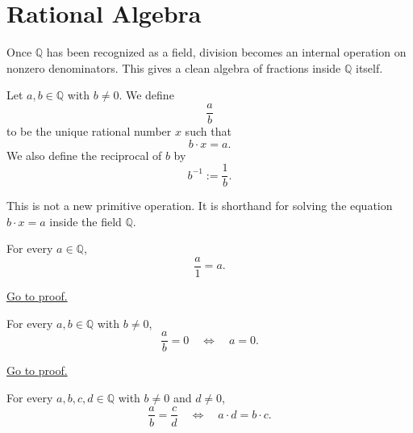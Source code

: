 
\section{Rational Algebra}
\label{sec:rational-algebra}

Once $\mathbb{Q}$ has been recognized as a field, division becomes an
internal operation on nonzero denominators. This gives a clean algebra of
fractions inside $\mathbb{Q}$ itself.

\begin{definition}
\label{def:rational-division}
Let $a,b\in \mathbb{Q}$ with $b\neq 0$. We define
\[
\frac{a}{b}
\]
to be the unique rational number $x$ such that
\[
b\cdot x=a.
\]
We also define the reciprocal of $b$ by
\[
b^{-1}:=\frac{1}{b}.
\]
\end{definition}

\begin{remark}
This is not a new primitive operation. It is shorthand for solving the
equation $b\cdot x=a$ inside the field $\mathbb{Q}$.
\end{remark}

\begin{theorem}
\label{thm:rational-division-by-one}
For every $a\in\mathbb{Q}$,
\[
\frac{a}{1}=a.
\]
\end{theorem}

\begin{remark*}[Proof]
\hyperref[prf:rational-division-by-one]{Go to proof.}
\end{remark*}

\begin{theorem}
\label{thm:rational-quotient-zero-iff-numerator-zero}
For every $a,b\in\mathbb{Q}$ with $b\neq 0$,
\[
\frac{a}{b}=0
\quad\Longleftrightarrow\quad
a=0.
\]
\end{theorem}

\begin{remark*}[Proof]
\hyperref[prf:rational-quotient-zero-iff-numerator-zero]{Go to proof.}
\end{remark*}

\begin{theorem}
\label{thm:rational-cross-multiplication}
For every $a,b,c,d\in\mathbb{Q}$ with $b\neq 0$ and $d\neq 0$,
\[
\frac{a}{b}=\frac{c}{d}
\quad\Longleftrightarrow\quad
a\cdot d=b\cdot c.
\]
\end{theorem}

